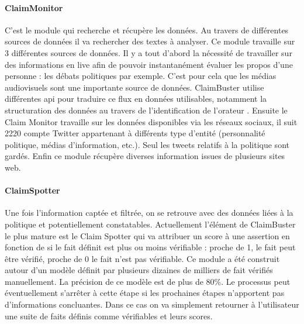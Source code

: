 \paragraph{ClaimMonitor}

C'est le module qui recherche et récupère les données. Au travers de différentes sources de données il va rechercher des textes à analyser. Ce module travaille sur 3 différentes sources de données. Il y a tout d'abord la nécessité de travailler sur des informations en live afin de pouvoir instantanément évaluer les propos d'une personne : les débats politiques par exemple. C'est pour cela que les médias audiovisuels sont une importante source de données. ClaimBuster utilise différentes api pour traduire ce flux en données utilisables, notamment la structuration des données au travers de l'identification de l'orateur \cite{joseph2015speaker}. Ensuite le Claim Monitor travaille sur les données disponibles via les réseaux sociaux, il suit 2220 compte Twitter appartenant à différents type d'entité (personnalité politique, médias d'information, etc.). Seul les tweets relatifs à la politique sont gardés. Enfin ce module récupère diverses information issues de plusieurs sites web.

\paragraph{ClaimSpotter}

Une fois l'information captée et filtrée, on se retrouve avec des données liées à la politique et potentiellement constatables. Actuellement l'élément de ClaimBuster le plus mature est le Claim Spotter qui va attribuer un score à une assertion en fonction de si le fait définit est plus ou moins vérifiable : proche de 1, le fait peut être vérifié, proche de 0 le fait n'est pas vérifiable. Ce module a été construit autour d'un modèle définit par plusieurs dizaines de milliers de fait vérifiés manuellement. La précision de ce modèle est de plus de 80\%.  Le processus peut éventuellement s'arrêter à cette étape si les prochaines étapes n'apportent pas d'informations concluantes. Dans ce cas on va simplement retourner à l'utilisateur une suite de faits définis comme vérifiables et leurs scores.

